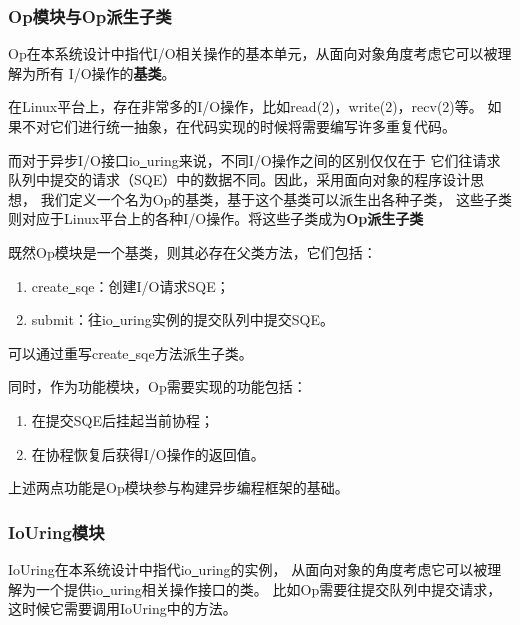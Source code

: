 \documentclass[supercite]{HustGraduPaper}
\theoremstyle{definition}
\begin{document}
\subsubsection{Op模块与Op派生子类}

Op在本系统设计中指代I/O相关操作的基本单元，从面向对象角度考虑它可以被理解为所有
I/O操作的\textbf{基类}。\par

在Linux平台上，存在非常多的I/O操作，比如read(2)，write(2)，recv(2)等。
如果不对它们进行统一抽象，在代码实现的时候将需要编写许多重复代码。\par

而对于异步I/O接口io\underline{~}uring来说，不同I/O操作之间的区别仅仅在于
它们往请求队列中提交的请求（SQE）中的数据不同。因此，采用面向对象的程序设计思想，
我们定义一个名为Op的基类，基于这个基类可以派生出各种子类，
这些子类则对应于Linux平台上的各种I/O操作。将这些子类成为\textbf{Op派生子类}\par

既然Op模块是一个基类，则其必存在父类方法，它们包括：

\begin{enumerate}
  \item create\underline{~}sqe：创建I/O请求SQE；
  \item submit：往io\underline{~}uring实例的提交队列中提交SQE。
\end{enumerate}

可以通过重写create\underline{~}sqe方法派生子类。\par

同时，作为功能模块，Op需要实现的功能包括：

\begin{enumerate}
  \item 在提交SQE后挂起当前协程；
  \item 在协程恢复后获得I/O操作的返回值。
\end{enumerate}

上述两点功能是Op模块参与构建异步编程框架的基础。\par

\subsubsection{IoUring模块}

IoUring在本系统设计中指代io\underline{~}uring的实例，
从面向对象的角度考虑它可以被理解为一个提供io\underline{~}uring相关操作接口的类。
比如Op需要往提交队列中提交请求，这时候它需要调用IoUring中的方法。\par
\end{document}
